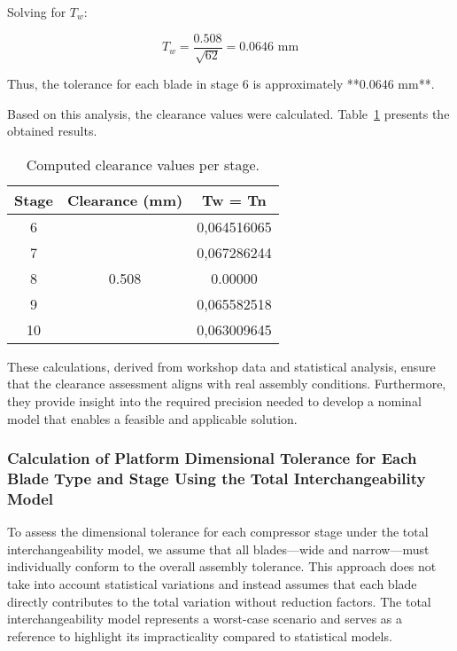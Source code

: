 Solving for \( T_w \):

\begin{equation}
    T_w = \frac{0.508}{\sqrt{62}} = 0.0646 \text{ mm}
\end{equation}

Thus, the tolerance for each blade in stage 6 is approximately **0.0646 mm**.

Based on this analysis, the clearance values were calculated. Table~\ref{tab:clearance} presents the obtained results.

\begin{table}[h]
    \centering
    \label{tab:clearance}
    \begin{tabular}{@{}ccc@{}}
        \toprule
        Stage & Clearance (mm) & Tw = Tn \\ 
        \midrule
        6  & & 0,064516065    \\ 
        7  &   & 0,067286244    \\ 
        8  & 0.508  & 0.00000 \\ 
        9  &   & 0,065582518    \\ 
        10 &   & 0,063009645    \\ 
        \bottomrule
    \end{tabular}
    \caption{Computed clearance values per stage.}
\end{table}

These calculations, derived from workshop data and statistical analysis, ensure that the clearance assessment aligns with real assembly conditions. Furthermore, they provide insight into the required precision needed to develop a nominal model that enables a feasible and applicable solution.

\subsubsection{Calculation of Platform Dimensional Tolerance for Each Blade Type and Stage Using the Total Interchangeability Model}
\label{subsubsec:clearance_calculation2}

To assess the dimensional tolerance for each compressor stage under the total interchangeability model, we assume that all blades—wide and narrow—must individually conform to the overall assembly tolerance. This approach does not take into account statistical variations and instead assumes that each blade directly contributes to the total variation without reduction factors. The total interchangeability model represents a worst-case scenario and serves as a reference to highlight its impracticality compared to statistical models.


